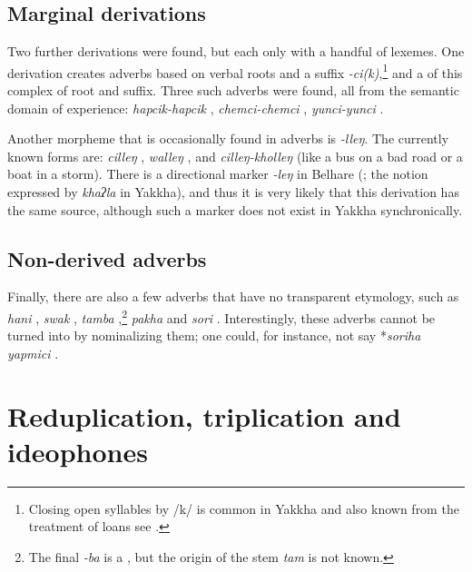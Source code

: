 \subsection{Marginal derivations}

Two further derivations were found, but each only with a handful of lexemes. One derivation creates adverbs based on verbal roots and a suffix \emph{-ci(k)},\footnote{Closing open syllables by /k/ is common in Yakkha and also known from the treatment of  loans see .} and a  of this complex of root and suffix. Three such adverbs were found, all from the semantic domain of experience:   \emph{hapcik-hapcik} , \emph{chemci-chemci} , \emph{yunci-yunci} .

Another morpheme that is occasionally found  in adverbs is \emph{-lleŋ}. The currently known forms are: \emph{cilleŋ} , \emph{walleŋ} , and \emph{cilleŋ-kholleŋ}  (like a bus on a bad road or a boat in a storm).
There is a  directional  marker \emph{-leŋ} in Belhare (\citealt{Bickel2003Belhare}; the notion expressed by \emph{khaʔla} in Yakkha), and thus it is very likely that this derivation has the same source, although such a marker does not exist in Yakkha synchronically.

\subsection{Non-derived adverbs}

Finally, there are also a few adverbs that have no transparent etymology, such as \emph{hani} , \emph{swak} , \emph{tamba} ,\footnote{The final  \emph{-ba} is a , but the origin of the stem \emph{tam} is not known.} \emph{pakha}  and \emph{sori} . Interestingly, these adverbs cannot be turned into  by nominalizing them; one could, for instance, not say *\emph{soriha yapmici} .

\section{Reduplication, triplication and ideophones}\label{redup}

